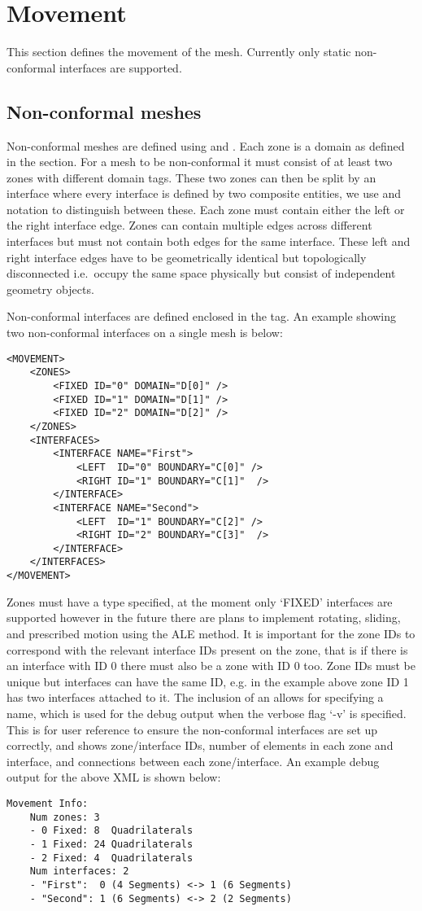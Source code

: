 \section{Movement}
This section defines the movement of the mesh. Currently only static
non-conformal interfaces are supported.

\subsection{Non-conformal meshes}\label{subsec:non-conformal-meshes}
Non-conformal meshes are defined using  and .
Each zone is a domain as defined in the  section. For a mesh to
be non-conformal it must consist of at least two zones with different domain
tags. These two zones can then be split by an interface where every interface is
defined by two composite entities, we use  and 
notation to distinguish between these. Each zone must contain either the left or
the right interface edge. Zones can contain multiple edges across different
interfaces but must not contain both edges for the same interface. These left
and right interface edges have to be geometrically identical but topologically
disconnected i.e.\ occupy the same space physically but consist of independent
geometry objects.

Non-conformal interfaces are defined enclosed in the  tag. An
example showing two non-conformal interfaces on a single mesh is below:

\begin{lstlisting}[style=XMLStyle]
<MOVEMENT>
    <ZONES>
        <FIXED ID="0" DOMAIN="D[0]" />
        <FIXED ID="1" DOMAIN="D[1]" />
        <FIXED ID="2" DOMAIN="D[2]" />
    </ZONES>
    <INTERFACES>
        <INTERFACE NAME="First">
            <LEFT  ID="0" BOUNDARY="C[0]" />
            <RIGHT ID="1" BOUNDARY="C[1]"  />
        </INTERFACE>
        <INTERFACE NAME="Second">
            <LEFT  ID="1" BOUNDARY="C[2]" />
            <RIGHT ID="2" BOUNDARY="C[3]"  />
        </INTERFACE>
    </INTERFACES>
</MOVEMENT>
\end{lstlisting}

Zones must have a type specified, at the moment only `FIXED' interfaces are
supported however in the future there are plans to implement rotating, sliding,
and prescribed motion using the ALE method. It is important for the zone IDs to
correspond with the relevant interface IDs present on the zone, that is if there
is an interface with ID 0 there must also be a zone with ID 0 too. Zone IDs must
be unique but interfaces can have the same ID, e.g. in the example above zone ID
1 has two interfaces attached to it. The inclusion of an
 allows for specifying a name, which is used for
the debug output when the verbose flag `-v' is specified. This is for user
reference to ensure the non-conformal interfaces are set up correctly, and shows
zone/interface IDs, number of elements in each zone and interface, and
connections between each zone/interface. An example debug output for the above
XML is shown below:

\begin{lstlisting}
Movement Info:
	Num zones: 3
	- 0 Fixed: 8  Quadrilaterals
	- 1 Fixed: 24 Quadrilaterals
	- 2 Fixed: 4  Quadrilaterals
	Num interfaces: 2
	- "First":  0 (4 Segments) <-> 1 (6 Segments)
	- "Second": 1 (6 Segments) <-> 2 (2 Segments)
\end{lstlisting}